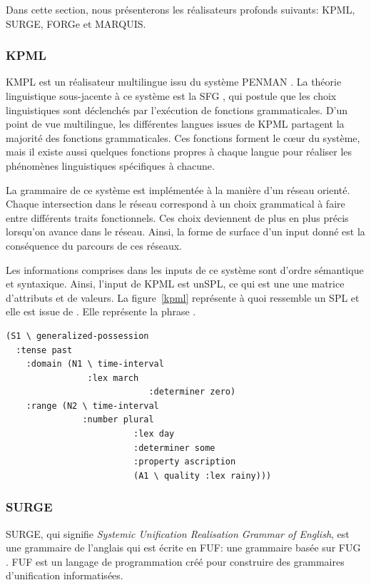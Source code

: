 Dans cette section, nous présenterons les réalisateurs profonds suivants: KPML, SURGE, FORGe et MARQUIS.

\subsubsection{KPML}
KMPL \citep{BatemanEnablingTechnologyMultilingual1997} est un réalisateur multilingue issu du système PENMAN \citep{PenmanOverview}. La théorie linguistique sous-jacente à ce système est la \ac{SFG} \citep{MatthiessenSystemicfunctionalgrammar1997}, qui postule que les choix linguistiques sont déclenchés par l'exécution de fonctions grammaticales. D'un point de vue multilingue, les différentes langues issues de KPML partagent la majorité des fonctions grammaticales. Ces fonctions forment le c\oe{}ur du système, mais il existe aussi quelques fonctions propres à chaque langue pour réaliser les phénomènes linguistiques spécifiques à chacune.

La grammaire de ce système est implémentée à la manière d'un réseau orienté. Chaque intersection dans le réseau correspond à un choix grammatical à faire entre différents traits fonctionnels. Ces choix deviennent de plus en plus précis lorsqu'on avance dans le réseau. Ainsi, la forme de surface d'un input donné est la conséquence du parcours de ces réseaux.

Les informations comprises dans les inputs de ce système sont d'ordre sémantique et syntaxique. Ainsi, l'input de KPML est un\ac{SPL}, ce qui est une une matrice d'attributs et de valeurs. La figure~\ref{kpml} représente à quoi ressemble un \ac{SPL} et elle est issue de \cite{ReiterBuildingNaturalLanguage2000}. Elle représente la phrase .

\begin{lstlisting}[language=Xml, caption=SPL: input de KPML, label=kpml]
(S1 \ generalized-possession
  :tense past 
	:domain (N1 \ time-interval
	            :lex march
							:determiner zero)
	:range (N2 \ time-interval
	           :number plural
						 :lex day
						 :determiner some
						 :property ascription
						 (A1 \ quality :lex rainy)))
\end{lstlisting}

\subsubsection{SURGE}
SURGE, qui signifie \emph{Systemic Unification Realisation Grammar of English}, est une grammaire de l'anglais \citep{Elhadad98surge:a} qui est écrite en \ac{FUF}: une grammaire basée sur \acf{FUG} \citep{KayFunctionalUnificationGrammar1984}. \ac{FUF} est un langage de programmation créé pour construire des grammaires d'unification informatisées.


